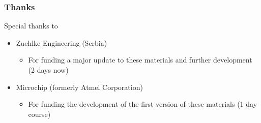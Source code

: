 \begin{frame}
\frametitle{Thanks}
   Special thanks to
   \begin{itemize}
     \item Zuehlke Engineering (Serbia)
     \begin{itemize}
	   \item For funding a major update to these materials and
           further development (2 days now)
     \end{itemize}
     \item Microchip (formerly Atmel Corporation)
     \begin{itemize}
	   \item For funding the development of the first version of
           these materials (1 day course)
     \end{itemize}
   \end{itemize}
\end{frame}
